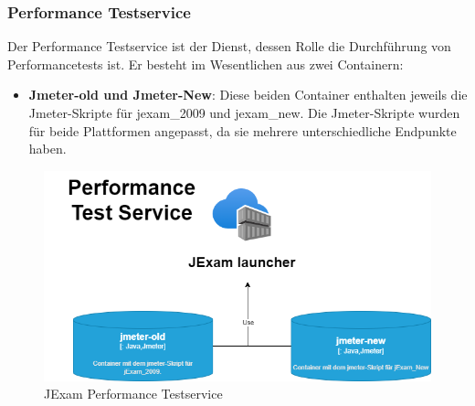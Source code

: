 \subsubsection{Performance Testservice}

Der Performance Testservice ist der Dienst, dessen Rolle die
Durchführung von Performancetests ist. Er besteht im Wesentlichen
aus zwei Containern:

\begin{itemize}
    \setlength\itemsep{1em}

    \item[] \textbf{Jmeter-old und Jmeter-New}: Diese beiden Container enthalten jeweils
    die Jmeter-Skripte für \Gls{jexam_2009} und \Gls{jexam_new}. Die
    Jmeter-Skripte wurden für beide Plattformen angepasst, da sie
    mehrere unterschiedliche Endpunkte haben.

\end{itemize}

\begin{figure}[H]
    \centering
    \includegraphics[scale=0.6]{images/performance.drawio}
    \caption{JExam Performance Testservice} \label{fig:per}
\end{figure}